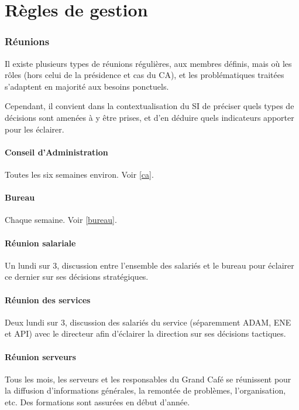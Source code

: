 \section{Règles de gestion}
\label{gestion}

\subsubsection{Réunions}

Il existe plusieurs types de réunions régulières, aux membres définis,
mais où les rôles (hors celui de la présidence et cas du CA),
et les problématiques traitées s'adaptent en majorité aux besoins ponctuels.

Cependant, il convient dans la contextualisation du SI de préciser quels types
de décisions sont amenées à y être prises, et d'en déduire quels indicateurs
apporter pour les éclairer.

\paragraph{Conseil d'Administration} Toutes les six semaines environ.
Voir \ref{ca}.

\paragraph{Bureau} Chaque semaine. Voir \ref{bureau}.

\paragraph{Réunion salariale} Un lundi sur 3, discussion entre l'ensemble
des salariés et le bureau pour éclairer ce dernier sur ses
décisions stratégiques.

\paragraph{Réunion des services} Deux lundi sur 3, discussion des
salariés du service (séparemment ADAM, ENE et API) avec le directeur
afin d'éclairer la direction sur ses décisions tactiques.

\paragraph{Réunion serveurs} Tous les mois, les serveurs et les responsables
du Grand Café se réunissent pour la diffusion d'informations générales,
la remontée de problèmes, l'organisation, etc. Des formations sont
assurées en début d'année.

